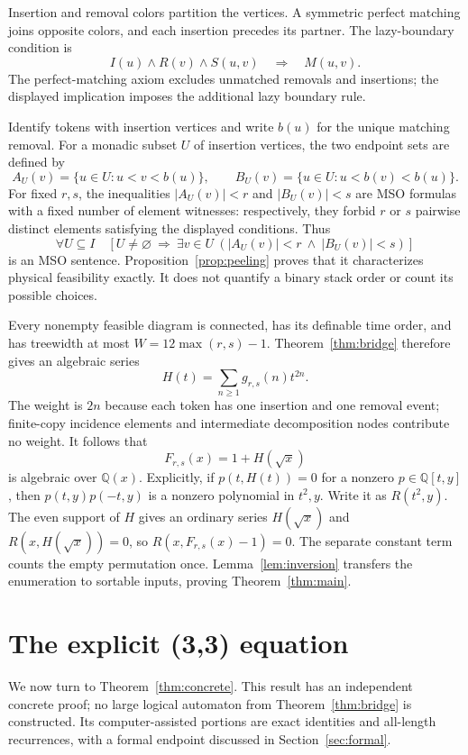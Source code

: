 \documentclass[11pt]{article}
\theoremstyle{definition}\newtheorem{definition}[theorem]{Definition}
\theoremstyle{remark}\newtheorem{remark}[theorem]{Remark}
\newcommand{\Q}{\mathbb Q}
\begin{document}
Insertion and removal colors partition the vertices. A symmetric perfect matching joins opposite colors, and each insertion precedes its partner. The lazy-boundary condition is
\[
 I(u)\wedge R(v)\wedge S(u,v)\quad\Longrightarrow\quad M(u,v).
\]
The perfect-matching axiom excludes unmatched removals and insertions; the displayed implication imposes the additional lazy boundary rule.

Identify tokens with insertion vertices and write $b(u)$ for the unique matching removal. For a monadic subset $U$ of insertion vertices, the two endpoint sets are defined by
\[
 A_U(v)=\{u\in U:u<v<b(u)\},\qquad
 B_U(v)=\{u\in U:u<b(v)<b(u)\}.
\]
For fixed $r,s$, the inequalities $|A_U(v)|<r$ and $|B_U(v)|<s$ are MSO formulas with a fixed number of element witnesses: respectively, they forbid $r$ or $s$ pairwise distinct elements satisfying the displayed conditions. Thus
\begin{equation}\label{eq:MSOpeel}
 \forall U\subseteq I\quad
 [U\ne\varnothing\ \Longrightarrow\
    \exists v\in U\ (|A_U(v)|<r\ \wedge\ |B_U(v)|<s)]
\end{equation}
is an MSO sentence. Proposition~\ref{prop:peeling} proves that it characterizes physical feasibility exactly. It does not quantify a binary stack order or count its possible choices.

Every nonempty feasible diagram is connected, has its definable time order, and has treewidth at most $W=12\max(r,s)-1$. Theorem~\ref{thm:bridge} therefore gives an algebraic series
\[
 H(t)=\sum_{n\ge1}g_{r,s}(n)t^{2n}.
\]
The weight is $2n$ because each token has one insertion and one removal event; finite-copy incidence elements and intermediate decomposition nodes contribute no weight. It follows that
\[
 F_{r,s}(x)=1+H(\sqrt{x})
\]
is algebraic over $\Q(x)$. Explicitly, if $p(t,H(t))=0$ for a nonzero $p\in\Q[t,y]$, then $p(t,y)p(-t,y)$ is a nonzero polynomial in $t^2,y$. Write it as $R(t^2,y)$. The even support of $H$ gives an ordinary series $H(\sqrt{x})$ and $R(x,H(\sqrt{x}))=0$, so $R(x,F_{r,s}(x)-1)=0$. The separate constant term counts the empty permutation once. Lemma~\ref{lem:inversion} transfers the enumeration to sortable inputs, proving Theorem~\ref{thm:main}.

\section{The explicit (3,3) equation}\label{sec:concrete}
We now turn to Theorem~\ref{thm:concrete}. This result has an independent concrete proof; no large logical automaton from Theorem~\ref{thm:bridge} is constructed. Its computer-assisted portions are exact identities and all-length recurrences, with a formal endpoint discussed in Section~\ref{sec:formal}.
\end{document}
